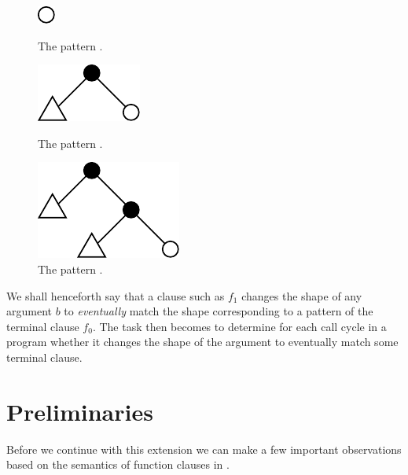 
\begin{figure}[htbp!]
\begin{minipage}{0.3\linewidth}
\centering
\includegraphics{figures/size-change-fail-f1-0}
\caption[]{The pattern .}
\label{figure:size-change-fail-f1-0}
\end{minipage}
\begin{minipage}{0.3\linewidth}
\centering
\includegraphics{figures/size-change-fail-f1-1}
\caption[]{The pattern .}
\label{figure:size-change-fail-f1-1}
\end{minipage}
\begin{minipage}{0.3\linewidth}
\centering
\includegraphics{figures/size-change-fail-f1-2}
\caption[]{The pattern .}
\label{figure:size-change-fail-f1-2}
\end{minipage}
\end{figure}

We shall henceforth say that a clause such as $f_1$ changes the shape of any
argument $b$ to \emph{eventually} match the shape corresponding to a pattern of
the terminal clause $f_0$. The task then becomes to determine for each call
cycle in a program whether it changes the shape of the argument to eventually
match some terminal clause.

\section{Preliminaries}

Before we continue with this extension we can make a few important observations
based on the semantics of function clauses in \D{}.

